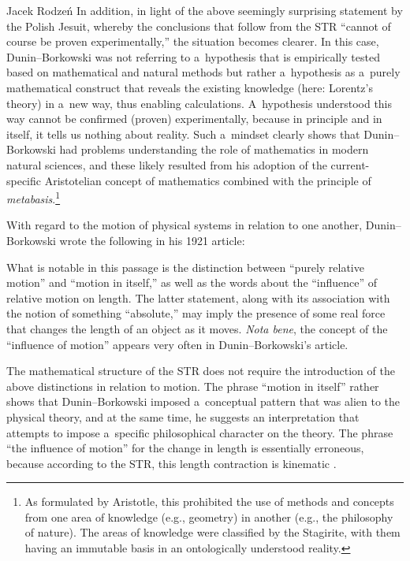\begin{artengenv}{Jacek Rodzeń}
In addition, in light of the above seemingly surprising statement by the Polish Jesuit, whereby the conclusions that follow from the STR ``cannot of course be proven experimentally,'' the situation becomes clearer. In this case, Dunin–Borkowski was not referring to a~hypothesis that is empirically tested based on mathematical and natural methods but rather a~hypothesis as a~purely mathematical construct that reveals the existing knowledge (here: Lorentz's theory) in a~new way, thus enabling calculations. A~hypothesis understood this way cannot be confirmed (proven) experimentally, because in principle and in itself, it tells us nothing about reality. Such a~mindset clearly shows that Dunin–Borkowski had problems understanding the role of mathematics in modern natural sciences, and these likely resulted from his adoption of the current-specific Aristotelian concept of mathematics combined with the principle of \textit{metabasis}.\footnote{As formulated by Aristotle, this prohibited the use of methods and concepts from one area of knowledge (e.g., geometry) in another (e.g., the philosophy of nature). The areas of knowledge were classified by the Stagirite, with them having an immutable basis in an ontologically understood reality.}

With regard to the motion of physical systems in relation to one another, Dunin–Borkowski wrote the following in his 1921 article:



What is notable in this passage is the distinction between ``purely relative motion'' and ``motion in itself,'' as well as the words about the ``influence'' of relative motion on length. The latter statement, along with its association with the notion of something ``absolute,'' may imply the presence of some real force that changes the length of an object as it moves. \textit{Nota bene}, the concept of the ``influence of motion'' appears very often in Dunin–Borkowski's article.

The mathematical structure of the STR does not require the introduction of the above distinctions in relation to motion. The phrase ``motion in itself'' rather shows that Dunin–Borkowski imposed a~conceptual pattern that was alien to the physical theory, and at the same time, he suggests an interpretation that attempts to impose a~specific philosophical character on the theory. The phrase ``the influence of motion'' for the change in length is essentially erroneous, because according to the STR, this length contraction is kinematic
\parencites[cf.][p.216]{heller_materia_1992}[][p.40]{heller_henri_1995}.%



\end{artengenv}
